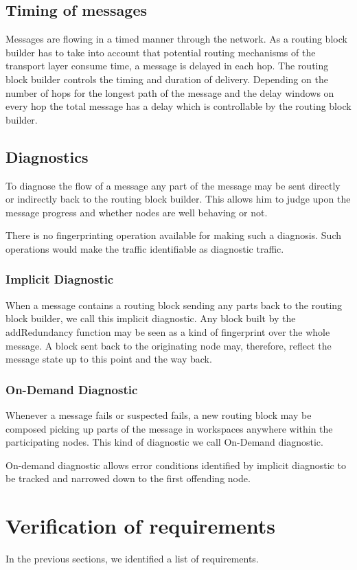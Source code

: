 \subsection{Timing of messages}
Messages are flowing in a timed manner through the network. As a routing block builder has to take into account that potential routing mechanisms of the transport layer consume time, a message is delayed in each hop.  The routing block builder controls the timing and duration of delivery. Depending on the number of hops for the longest path of the message and the delay windows on every hop the total message has a delay which is controllable by the routing block builder.

\subsection{Diagnostics}
To diagnose the flow of a message any part of the message may be sent directly or indirectly back to the routing block builder. This allows him to judge upon the message progress and whether nodes are well behaving or not.

There is no fingerprinting operation available for making such a diagnosis. Such operations would make the traffic identifiable as diagnostic traffic.

\subsubsection{Implicit Diagnostic}
When a message contains a routing block sending any parts back to the routing block builder, we call this implicit diagnostic. Any block built by the addRedundancy function may be seen as a kind of fingerprint over the whole message. A block sent back to the originating node may, therefore, reflect the message state up to this point and the way back.

\subsubsection{On-Demand Diagnostic}
Whenever a message fails or suspected fails, a new routing block may be composed picking up parts of the message in workspaces anywhere within the participating nodes. This kind of diagnostic we call On-Demand diagnostic.

On-demand diagnostic allows error conditions identified by implicit diagnostic to be tracked and narrowed down to the first offending node.

\section{Verification of requirements}
In the previous sections, we identified a list of requirements.


